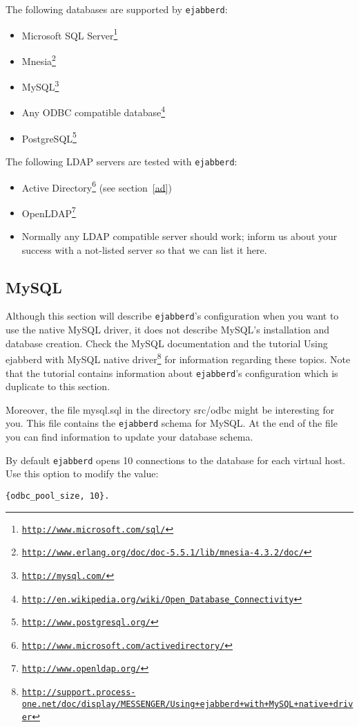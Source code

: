 \documentclass[a4paper,10pt]{book}
\newcommand{\ind}[1]{\begin{latexonly}\index{#1}\end{latexonly}}
\newcommand{\ejabberd}{\texttt{ejabberd}}
\gdef\footahref#1#2{#2\footnote{\href{#1}{\texttt{#1}}}}
\begin{document}
The following databases are supported by \ejabberd{}:
\begin{itemize}
\item \footahref{http://www.microsoft.com/sql/}{Microsoft SQL Server}
\item \footahref{http://www.erlang.org/doc/doc-5.5.1/lib/mnesia-4.3.2/doc/}{Mnesia}
\item \footahref{http://mysql.com/}{MySQL}
\item \footahref{http://en.wikipedia.org/wiki/Open\_Database\_Connectivity}{Any ODBC compatible database}
\item \footahref{http://www.postgresql.org/}{PostgreSQL}
\end{itemize}

The following LDAP servers are tested with \ejabberd{}:
\begin{itemize}
\item \footahref{http://www.microsoft.com/activedirectory/}{Active Directory}
  (see section~\ref{ad})
\item \footahref{http://www.openldap.org/}{OpenLDAP}
\item Normally any LDAP compatible server should work; inform us about your
  success with a not-listed server so that we can list it here.
\end{itemize}

\subsection{MySQL}
\label{mysql}
\ind{MySQL}\ind{MySQL!schema}

Although this section will describe \ejabberd{}'s configuration when you want to
use the native MySQL driver, it does not describe MySQL's installation and
database creation. Check the MySQL documentation and the tutorial \footahref{http://support.process-one.net/doc/display/MESSENGER/Using+ejabberd+with+MySQL+native+driver}{Using ejabberd with MySQL native driver} for information regarding these topics.
Note that the tutorial contains information about \ejabberd{}'s configuration
which is duplicate to this section.

Moreover, the file mysql.sql in the directory src/odbc might be interesting for
you. This file contains the \ejabberd{} schema for MySQL. At the end of the file
you can find information to update your database schema.

By default \ejabberd{} opens 10 connections to the database for each virtual host.
Use this option to modify the value:
\begin{verbatim}
{odbc_pool_size, 10}.
\end{verbatim}
\end{document}
